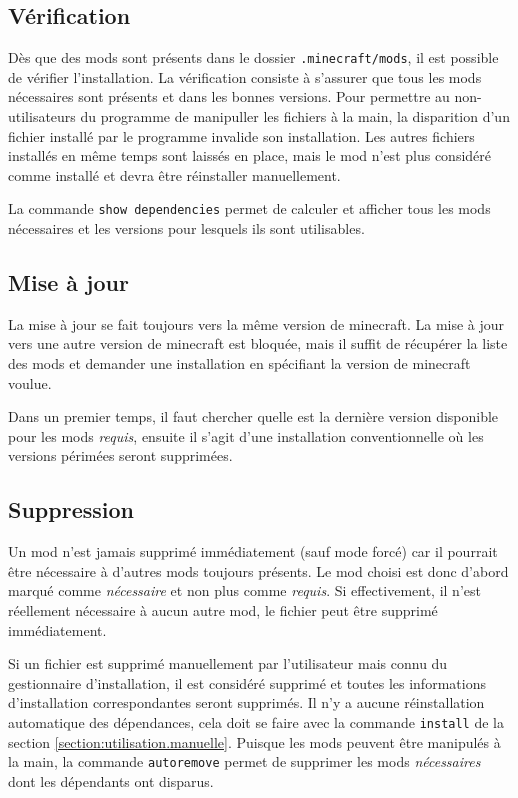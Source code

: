 \documentclass{article}
\begin{document}
\subsection{Vérification}
Dès que des mods sont présents dans le dossier \texttt{.minecraft/mods}, il est possible de vérifier l'installation.
La vérification consiste à s'assurer que tous les mods nécessaires sont présents et dans les bonnes versions.
Pour permettre au non-utilisateurs du programme de manipuller les fichiers à la main, la disparition d'un fichier installé par le programme invalide son installation.
Les autres fichiers installés en même temps sont laissés en place, mais le mod n'est plus considéré comme installé et devra être réinstaller manuellement.

La commande \texttt{show dependencies} permet de calculer et afficher tous les mods nécessaires et les versions pour lesquels ils sont utilisables.

\subsection{Mise à jour}
\label{section:utilisation.miseajour}
La mise à jour se fait toujours vers la même version de minecraft.
La mise à jour vers une autre version de minecraft est bloquée, mais il suffit de récupérer la liste des mods et demander une installation en spécifiant la version de minecraft voulue.

Dans un premier temps, il faut chercher quelle est la dernière version disponible pour les mods \textit{requis}, ensuite il s'agit d'une installation conventionnelle où les versions périmées seront supprimées.

\subsection{Suppression}
Un mod n'est jamais supprimé immédiatement (sauf mode forcé) car il pourrait être nécessaire à d'autres mods toujours présents.
Le mod choisi est donc d'abord marqué comme \textit{nécessaire} et non plus comme \textit{requis}.
Si effectivement, il n'est réellement nécessaire à aucun autre mod, le fichier peut être supprimé immédiatement.

Si un fichier est supprimé manuellement par l'utilisateur mais connu du gestionnaire d'installation, il est considéré supprimé et toutes les informations d'installation correspondantes seront supprimés.
Il n'y a aucune réinstallation automatique des dépendances, cela doit se faire avec la commande \texttt{install} de la section \ref{section:utilisation.manuelle}.
Puisque les mods peuvent être manipulés à la main, la commande \texttt{autoremove} permet de supprimer les mods \textit{nécessaires} dont les dépendants ont disparus.
\end{document}

